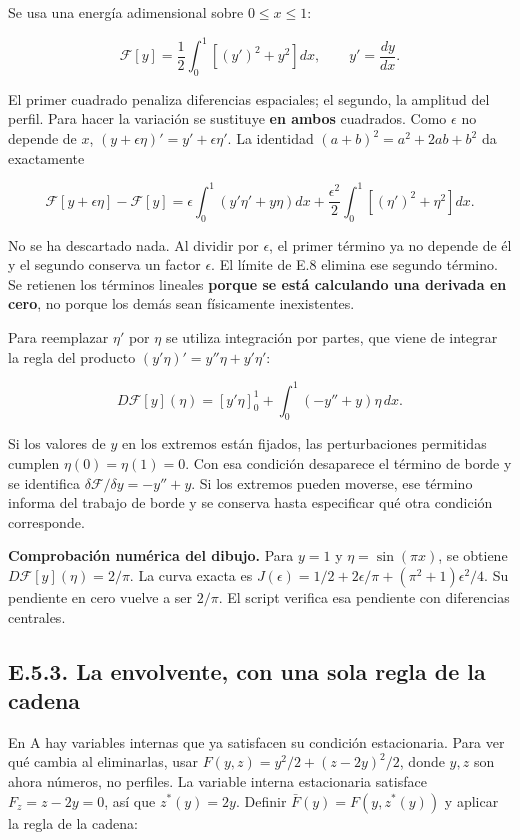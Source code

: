 \documentclass[
  spanish,
  10pt,
  a4paper,
]{article}
\begin{document}
Se usa una energía adimensional sobre \(0\leq x\leq1\):

\[
\mathcal F[y]=\frac12\int_0^1[(y')^2+y^2]dx,
\qquad y'=\frac{dy}{dx}.
\tag{E.9}
\]

El primer cuadrado penaliza diferencias espaciales; el segundo, la
amplitud del perfil. Para hacer la variación se sustituye \textbf{en
ambos} cuadrados. Como \(\epsilon\) no depende de \(x\),
\((y+\epsilon\eta)'=y'+\epsilon\eta'\). La identidad
\((a+b)^2=a^2+2ab+b^2\) da exactamente

\[
\mathcal F[y+\epsilon\eta]-\mathcal F[y]
=\epsilon\int_0^1(y'\eta'+y\eta)dx
+\frac{\epsilon^2}{2}\int_0^1[(\eta')^2+\eta^2]dx.
\tag{E.10}
\]

No se ha descartado nada. Al dividir por \(\epsilon\), el primer término
ya no depende de él y el segundo conserva un factor \(\epsilon\). El
límite de E.8 elimina ese segundo término. Se retienen los términos
lineales \textbf{porque se está calculando una derivada en cero}, no
porque los demás sean físicamente inexistentes.

Para reemplazar \(\eta'\) por \(\eta\) se utiliza integración por
partes, que viene de integrar la regla del producto
\((y'\eta)'=y''\eta+y'\eta'\):

\[
D\mathcal F[y](\eta)
=[y'\eta]_0^1+\int_0^1(-y''+y)\eta\,dx.
\tag{E.11}
\]

Si los valores de \(y\) en los extremos están fijados, las
perturbaciones permitidas cumplen \(\eta(0)=\eta(1)=0\). Con esa
condición desaparece el término de borde y se identifica
\(\delta\mathcal F/\delta y=-y''+y\). Si los extremos pueden moverse,
ese término informa del trabajo de borde y se conserva hasta especificar
qué otra condición corresponde.

\textbf{Comprobación numérica del dibujo.} Para \(y=1\) y
\(\eta=\sin(\pi x)\), se obtiene \(D\mathcal F[y](\eta)=2/\pi\). La
curva exacta es \(J(\epsilon)=1/2+2\epsilon/\pi+(\pi^2+1)\epsilon^2/4\).
Su pendiente en cero vuelve a ser \(2/\pi\). El script verifica esa
pendiente con diferencias centrales.

\subsection{E.5.3. La envolvente, con una sola regla de la
cadena}\label{e.5.3.-la-envolvente-con-una-sola-regla-de-la-cadena}

En A hay variables internas que ya satisfacen su condición estacionaria.
Para ver qué cambia al eliminarlas, usar \(F(y,z)=y^2/2+(z-2y)^2/2\),
donde \(y,z\) son ahora números, no perfiles. La variable interna
estacionaria satisface \(F_z=z-2y=0\), así que \(z^*(y)=2y\). Definir
\(\bar F(y)=F(y,z^*(y))\) y aplicar la regla de la cadena:
\end{document}
